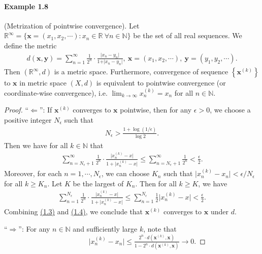 \documentclass{article}
\begin{document}
\paragraph{Example 1.8\label{example:1.8}} (Metrization of pointwise convergence). Let $\mathbb{R}^\infty=\{\mathbf{x}=(x_1,x_2,\cdots):x_n\in\mathbb{R}\ \forall n\in\mathbb{N}\}$ be the set of all real sequences. We define the metric
\begin{align*}
	d(\mathbf{x},\mathbf{y}) = \sum_{n=1}^\infty \frac{1}{2^n}\cdot\frac{\vert x_n-y_n\vert}{1+\vert x_n-y_n\vert},\ \mathbf{x}=(x_1,x_2,\cdots),\ \mathbf{y}=(y_1,y_2,\cdots).
\end{align*}
Then $(\mathbb{R}^\infty,d)$ is a metric space. Furthermore, convergence of sequence $\left\{\mathbf{x}^{(k)}\right\}$ to $\mathbf{x}$ in metric space $(X,d)$ is equivalent to pointwise convergence (or coordinate-wise convergence), i.e. $\lim_{k\to\infty}x_n^{(k)}=x_n$ for all $n\in\mathbb{N}$.
\begin{proof}
``$\Leftarrow$'': If $\mathbf{x}^{(k)}$ converges to $\mathbf{x}$ pointwise, then for any $\epsilon > 0$, we choose a positive integer $N_\epsilon$ such that 
\begin{align*}
	N_\epsilon > \frac{1+\log(1/\epsilon)}{\log 2}.
\end{align*}
Then we have for all $k\in\mathbb{N}$ that
\begin{align*}
	\sum_{n=N_\epsilon+1}^\infty \frac{1}{2^n}\cdot\frac{\bigl\vert x_n^{(k)}-x\bigr\vert}{1+\bigl\vert x_n^{(k)}-x\bigr\vert} \leq \sum_{n=N_\epsilon+1}^\infty \frac{1}{2^n} < \frac{\epsilon}{2}.\tag{1.3}\label{eq:1.3}
\end{align*}
Moreover, for each $n=1,\cdots,N_\epsilon$, we can choose $K_n$ such that $\bigl\vert x^{(k)}_n-x_n\bigr\vert < \epsilon/N_\epsilon$ for all $k\geq K_n$. Let $K$ be the largest of $K_n$. Then for all $k\geq K$, we have
\begin{align*}
	\sum_{n=1}^{N_\epsilon}\frac{1}{2^n}\cdot\frac{\bigl\vert x_n^{(k)}-x\bigr\vert}{1+\bigl\vert x_n^{(k)}-x\bigr\vert}\leq \sum_{n=1}^{N_\epsilon}\frac{1}{2}\bigl\vert x_n^{(k)}-x\bigr\vert < \frac{\epsilon}{2}.\tag{1.4}\label{eq:1.4}
\end{align*}
Combining \hyperref[eq:1.3]{(1.3)} and \hyperref[eq:1.4]{(1.4)}, we conclude that $\mathbf{x}^{(k)}$ converges to $\mathbf{x}$ under $d$.
\vspace{0.12cm}

``$\Rightarrow$'':  For any $n\in\mathbb{N}$ and sufficiently large $k$, note that\\

$\hspace{5cm}\displaystyle\bigl\vert x_n^{(k)}-x_n\bigr\vert \leq \frac{2^n\cdot d(\mathbf{x}^{(k)},\mathbf{x})}{1-2^n\cdot d(\mathbf{x}^{(k)},\mathbf{x})}\to 0.$
\end{proof}
\end{document}
